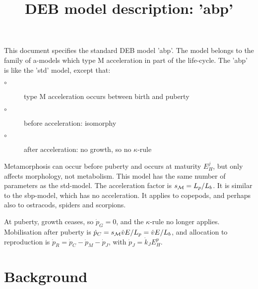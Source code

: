 \documentclass{article}
\title{DEB model description: 'abp'}
\begin{document}
\maketitle

This document specifies the standard DEB model 'abp'. The model belongs to the family of a-models which  type {\cal M} acceleration in part of the life-cycle. 
The 'abp' is like the 'std' model, except that:
\begin{description}
  \item[$\circ$] type {\cal M} acceleration occurs between birth and puberty
	
  \item[$\circ$] before acceleration: isomorphy
	
  \item[$\circ$] after acceleration: no growth, so no $\kappa$-rule
\end{description}
Metamorphosis can occur before puberty and occurs at maturity $E_H^j$, but only affects morphology, not metabolism.
This model has the same number of parameters as the std-model.
The acceleration factor is $s_{\cal M} = L_p/ L_b$. 
It is similar to the sbp-model, which has no acceleration.
It applies to copepods, and perhaps also to ostracods, spiders and scorpions.

At puberty, growth ceases, so $\dot{p}_G = 0$, and the $\kappa$-rule no longer applies. 
Mobilisation after puberty is $\dot{p}_C = s_{\cal M} \dot{v} E/ L_p = \dot{v} E/ L_b$, 
  and allocation to reproduction is $\dot{p}_R = \dot{p}_C - \dot{p}_M - \dot{p}_J$, with $\dot{p}_J = \dot{k}_J E_H^p$.

\section{Background}







\end{document}
